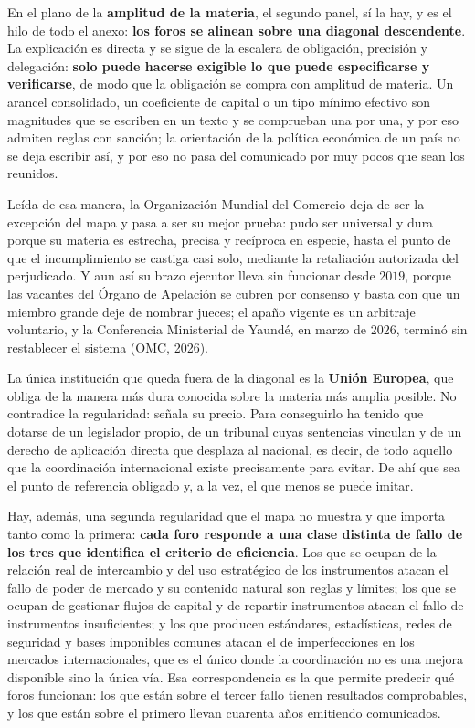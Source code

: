 \documentclass[10pt,a4paper]{article}
\newcounter{anexo}
\begin{document}
En el plano de la \textbf{amplitud de la materia}, el segundo panel, sí la hay, y es el hilo de todo el anexo: \textbf{los foros se alinean sobre una diagonal descendente}. La explicación es directa y se sigue de la escalera de obligación, precisión y delegación: \textbf{solo puede hacerse exigible lo que puede especificarse y verificarse}, de modo que la obligación se compra con amplitud de materia. Un arancel consolidado, un coeficiente de capital o un tipo mínimo efectivo son magnitudes que se escriben en un texto y se comprueban una por una, y por eso admiten reglas con sanción; la orientación de la política económica de un país no se deja escribir así, y por eso no pasa del comunicado por muy pocos que sean los reunidos.

Leída de esa manera, la Organización Mundial del Comercio deja de ser la excepción del mapa y pasa a ser su mejor prueba: pudo ser universal y dura porque su materia es estrecha, precisa y recíproca en especie, hasta el punto de que el incumplimiento se castiga casi solo, mediante la retaliación autorizada del perjudicado. Y aun así su brazo ejecutor lleva sin funcionar desde $2019$, porque las vacantes del Órgano de Apelación se cubren por consenso y basta con que un miembro grande deje de nombrar jueces; el apaño vigente es un arbitraje voluntario, y la Conferencia Ministerial de Yaundé, en marzo de $2026$, terminó sin restablecer el sistema (OMC, 2026).

La única institución que queda fuera de la diagonal es la \textbf{Unión Europea}, que obliga de la manera más dura conocida sobre la materia más amplia posible. No contradice la regularidad: señala su precio. Para conseguirlo ha tenido que dotarse de un legislador propio, de un tribunal cuyas sentencias vinculan y de un derecho de aplicación directa que desplaza al nacional, es decir, de todo aquello que la coordinación internacional existe precisamente para evitar. De ahí que sea el punto de referencia obligado y, a la vez, el que menos se puede imitar.

Hay, además, una segunda regularidad que el mapa no muestra y que importa tanto como la primera: \textbf{cada foro responde a una clase distinta de fallo de los tres que identifica el criterio de eficiencia}. Los que se ocupan de la relación real de intercambio y del uso estratégico de los instrumentos atacan el fallo de poder de mercado y su contenido natural son reglas y límites; los que se ocupan de gestionar flujos de capital y de repartir instrumentos atacan el fallo de instrumentos insuficientes; y los que producen estándares, estadísticas, redes de seguridad y bases imponibles comunes atacan el de imperfecciones en los mercados internacionales, que es el único donde la coordinación no es una mejora disponible sino la única vía. Esa correspondencia es la que permite predecir qué foros funcionan: los que están sobre el tercer fallo tienen resultados comprobables, y los que están sobre el primero llevan cuarenta años emitiendo comunicados.
\end{document}
